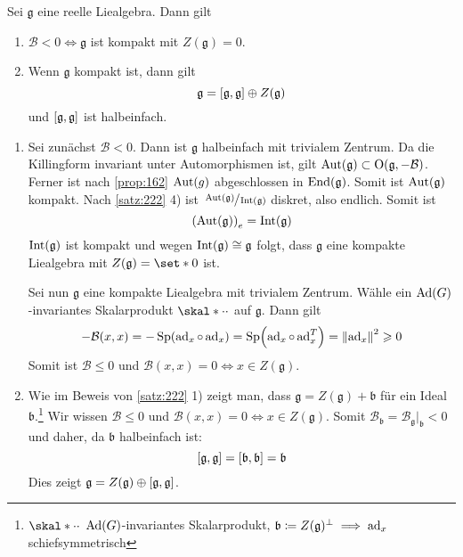 \begin{lemma}
	Sei $\mathfrak{g}$ eine reelle Liealgebra.
	Dann gilt 
	\begin{enumerate}[1)]
		\item $\mathcal{B} < 0 \iff \mathfrak{g}$ ist kompakt mit $Z(\mathfrak{g})=0$.
		\item Wenn $\mathfrak{g}$ kompakt ist, dann gilt 
		\[
			\mathfrak{g} = \benbrace*{\mathfrak{g},\mathfrak{g}} \oplus Z(\mathfrak{g})
		\]
		und $\benbrace*{\mathfrak{g},\mathfrak{g}}$ ist halbeinfach.
	\end{enumerate}
\end{lemma}
\begin{beweis}
	\begin{enumerate}[1)]
		\item Sei zunächst $\mathcal{B} < 0$.
		Dann ist $\mathfrak{g}$ halbeinfach mit trivialem Zentrum.
		Da die Killingform invariant unter Automorphismen ist, gilt $\Aut(\mathfrak{g}) \subset \On(\mathfrak{g},-\mathcal{B})$.
		Ferner ist nach \autoref{prop:162} $\Aut(g)$ abgeschlossen in $\End(\mathfrak{g})$.
		Somit ist $\Aut(\mathfrak{g})$ kompakt.
		Nach \autoref{satz:222} 4) ist $\sfrac{\Aut(\mathfrak{g})}{\Int(\mathfrak{g})}$ diskret, also endlich.
		Somit ist
		\[
			\enbrace*{\Aut(\mathfrak{g})}_e = \Int(\mathfrak{g})
		\]
		$\Int(\mathfrak{g})$ ist kompakt und wegen $\Int(\mathfrak{g}) \cong \mathfrak{g}$ folgt, dass $\mathfrak{g}$ eine kompakte Liealgebra mit $Z(\mathfrak{g})= \set*{0}$ ist.
		
		Sei nun $\mathfrak{g}$ eine kompakte Liealgebra mit trivialem Zentrum.
		Wähle ein $\Ad(G)$-invariantes Skalarprodukt $\skal*{\cdot}{\cdot}$ auf $\mathfrak{g}$.
		Dann gilt 
		\[
			- \mathcal{B}(x,x) = - \Sp \enbrace*{\ad_x \circ \ad_x} = \Sp \enbrace*{\ad_x \circ \ad_x^T} = \norm*{\ad_x}^2 \ge 0
		\]
		Somit ist $\mathcal{B} \le 0$ und $\mathcal{B}(x,x)=0 \iff x \in Z(\mathfrak{g})$.
		\item Wie im Beweis von \autoref{satz:222} 1) zeigt man, dass $\mathfrak{g} = Z(\mathfrak{g}) + \mathfrak{b}$ für ein Ideal $\mathfrak{b}$.\footnote{$\skal*{\cdot}{\cdot}$ $\Ad(G)$-invariantes Skalarprodukt, $\mathfrak{b} \coloneqq Z(\mathfrak{g})^\perp \implies \ad_x$ schiefsymmetrisch}
		Wir wissen $\mathcal{B} \le 0$ und $\mathcal{B}(x,x) =0 \iff x \in Z(\mathfrak{g})$.
		Somit $\mathcal{B}_\mathfrak{b} = \mathcal{B}_{\mathfrak{g}}|_{\mathfrak{b}} < 0$ und daher, da $\mathfrak{b}$ halbeinfach ist:
		\[
			\benbrace*{\mathfrak{g},\mathfrak{g}} = \benbrace*{\mathfrak{b},\mathfrak{b}} = \mathfrak{b}
		\]
		Dies zeigt $\mathfrak{g} = Z(\mathfrak{g}) \oplus \benbrace*{\mathfrak{g},\mathfrak{g}}$.\qedhere
	\end{enumerate}
\end{beweis}

